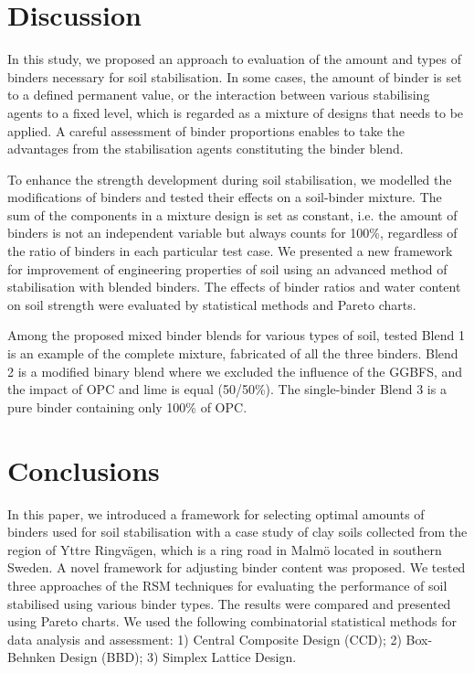 \documentclass[eprint,
]{actapoly}
\begin{document}
\section{Discussion}
In this study, we proposed an approach to evaluation of the amount and types of binders necessary for soil stabilisation. In some cases, the amount of binder is set to a defined permanent value, or the interaction between various stabilising agents to a fixed level, which is regarded as a mixture of designs that needs to be applied. A careful assessment of binder proportions enables to take the advantages from the stabilisation agents constituting the binder blend. 

To enhance the strength development during soil stabilisation, we modelled the modifications of binders and tested their effects on a soil-binder mixture. The sum of the components in a mixture design is set as constant, i.e. the amount of binders is not an independent variable but always counts for 100\%, regardless of the ratio of binders in each particular test case. We presented a new framework for improvement of engineering properties of soil using an advanced method of stabilisation with blended binders. The effects of binder ratios and water content on soil strength were evaluated by statistical methods and Pareto charts.

Among the proposed mixed binder blends for various types of soil, tested Blend 1 is an example of the complete mixture, fabricated of all the three binders. Blend 2 is a modified binary blend where we excluded the influence of the GGBFS, and the impact of OPC and lime is equal (50/50\%). The single-binder Blend 3 is a pure binder containing only 100\% of OPC. 

\section{Conclusions}
In this paper, we introduced a framework for selecting optimal amounts of binders used for soil stabilisation with a case study of clay soils collected from the region of Yttre Ringvägen, which is a ring road in Malmö located in southern Sweden. A novel framework for adjusting binder content was proposed. We tested three approaches of the RSM techniques for evaluating the performance of soil stabilised using various binder types. The results were compared and presented using Pareto charts. We used the following combinatorial statistical methods for data analysis and assessment: 1) Central Composite Design (CCD); 2) Box-Behnken Design (BBD); 3) Simplex Lattice Design. 
\end{document}
